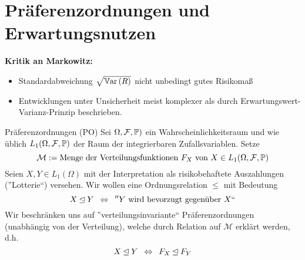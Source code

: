 \section{Präferenzordnungen und Erwartungsnutzen}

\textbf{Kritik an Markowitz:}
\begin{itemize}[nolistsep, topsep=-\parskip]
	\item Standardabweichung $\sqrt{\Var[R]}$ nicht unbedingt gutes Risikomaß
	\item Entwicklungen unter Unsicherheit meist komplexer als durch Erwartungswert-Varianz-Prinzip beschrieben.
\end{itemize}

\vspace{\parskip}

 Präferenzordnungen (PO)
Sei $\Omega, \F, \P)$ ein Wahrscheinlichkeitsraum und wie üblich $L_1(\Omega, \F, \P)$ der Raum der integrierbaren Zufallsvariablen. Setze
\begin{equation*}
	\mathcal{M} \defeq \text{Menge der Verteilungsfunktionen } F_X \text{ von } X \in L_1(\Omega, \F, \P)
\end{equation*}
Seien $X,Y \in L_1(\Omega)$ mit der Interpretation als risikobehaftete Auszahlungen (''Lotterie``) versehen. Wir wollen eine Ordnungsrelation $\leqslant$ mit Bedeutung
\begin{equation*}
	X \unlhd Y \equivalent ''Y \text{ wird bevorzugt gegenüber } X``
\end{equation*}
Wir beschränken uns auf ''verteilungsinvariante`` Präferenzordnungen (unabhängig von der Verteilung), welche durch Relation auf $\mathcal{M}$ erklärt werden, d.h.
\begin{equation*}
	X \unlhd Y \equivalent F_X \unlhd F_Y
\end{equation*}

